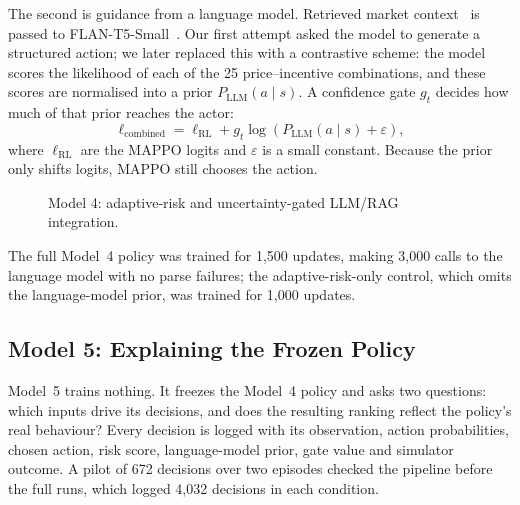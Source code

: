 \documentclass[conference]{IEEEtran}
\begin{document}
The second is guidance from a language model. Retrieved market context~\cite{lewis2020rag} is passed to FLAN-T5-Small~\cite{chung2024flan,flant5small}. Our first attempt asked the model to generate a structured action; we later replaced this with a contrastive scheme: the model scores the likelihood of each of the 25 price--incentive combinations, and these scores are normalised into a prior $P_{\mathrm{LLM}}(a\mid s)$. A confidence gate $g_t$ decides how much of that prior reaches the actor:
\begin{equation}
  \ell_{\mathrm{combined}} = \ell_{\mathrm{RL}} + g_t \log\left(P_{\mathrm{LLM}}(a \mid s) + \varepsilon\right),
\end{equation}
where $\ell_{\mathrm{RL}}$ are the MAPPO logits and $\varepsilon$ is a small constant. Because the prior only shifts logits, MAPPO still chooses the action.

\begin{figure}[!t]
\centering
{}
\caption{Model 4: adaptive-risk and uncertainty-gated LLM/RAG integration.}
\label{fig:m4arch}
\end{figure}

The full Model~4 policy was trained for 1,500 updates, making 3,000 calls to the language model with no parse failures; the adaptive-risk-only control, which omits the language-model prior, was trained for 1,000 updates.

\subsection{Model 5: Explaining the Frozen Policy}
Model~5 trains nothing. It freezes the Model~4 policy and asks two questions: which inputs drive its decisions, and does the resulting ranking reflect the policy's real behaviour? Every decision is logged with its observation, action probabilities, chosen action, risk score, language-model prior, gate value and simulator outcome. A pilot of 672 decisions over two episodes checked the pipeline before the full runs, which logged 4,032 decisions in each condition.
\end{document}
